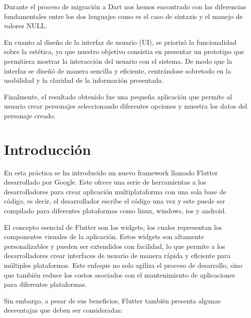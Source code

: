 \documentclass{article}
\begin{document}
Durante el proceso de migración a Dart nos hemos encontrado con las diferencias fundamentales entre los dos lenguajes como es el caso de sintaxis y el manejo de valores NULL.

En cuanto al diseño de la interfaz de usuario (UI), se priorizó la funcionalidad sobre la estética, ya que nuestro objetivo consistia en presentar un prototipo que permitiera mostrar 
la interacción del usuario con el sistema. De modo que la interfaz se diseñó de manera sencilla y eficiente, centrándose sobretodo en la usabilidad y la claridad de la información presentada.

Finalmente, el resultado obtenido fue una pequeña aplicación que permite al usuario crear personajes seleccionando diferentes opciones y muestra los datos del personaje creado.


\section{Introducción}

En esta práctica se ha introducido un nuevo framework llamado Flutter desarrollado por Google. Este ofrece una serie de herramientas a los desarrolladores para 
crear aplicación multiplataforma con una sola base de código, es decir, el desarrollador escribe el código una vez y este puede ser compilado para diferentes plataformas como linux, windows, ios y android.

El concepto esencial de Flutter son los widgets, los cuales representan los componentes visuales de la aplicación. 
Estos widgets son altamente personalizables y pueden ser extendidos con facilidad, lo que permite a los desarrolladores crear interfaces
de usuario de manera rápida y eficiente para múltiples plataformas. Este enfoque no solo agiliza el proceso de desarrollo, sino que también 
reduce los costos asociados con el mantenimiento de aplicaciones para diferentes plataformas.

Sin embargo, a pesar de sus beneficios, Flutter también presenta algunas desventajas que deben ser consideradas:
\end{document}
